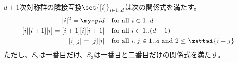 	\begin{proposition}[隣接互換の関係式]\label{prop:隣接互換の関係式} %
		$d+1$次対称群の隣接互換$\set{[i]}_{i\in1..d}$は次の関係式を満たす。
		\begin{equation*}\begin{split} %
			[i]^2 = \myid &\quad\text{for all }i\in1..d \\
			[i][i+1][i] = [i+1][i][i+1] &\quad\text{for all }i\in1..(d-1) \\
			[i][j] = [j][i]
			&\quad\text{for all }i,j\in1..d\text{ and }2\le\zettai{i-j} \\
		\end{split}\end{equation*} %
		ただし、$S_2$は一番目だけ、$S_3$は一番目と二番目だけの関係式を満たす。
	\end{proposition} %
